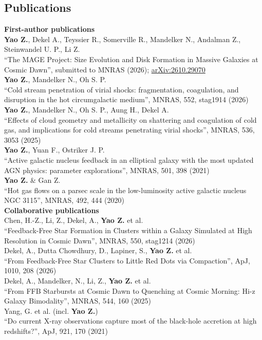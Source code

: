 \documentclass[margin, 10pt]{res} %
\begin{document}
\begin{resume}
\section{Publications}

\textbf{First-author publications}\\[4pt]
\textbf{Yao Z.}, Dekel A., Teyssier R., Somerville R., Mandelker N., Andalman Z., Steinwandel U. P., Li Z.\\
``The MAGE Project: Size Evolution and Disk Formation in Massive Galaxies at Cosmic Dawn'', submitted to MNRAS (2026); \href{https://arxiv.org/abs/2610.29070}{arXiv:2610.29070}\\[4pt]
\textbf{Yao Z.}, Mandelker N., Oh S. P.\\
``Cold stream penetration of virial shocks: fragmentation, coagulation, and disruption in the hot circumgalactic medium'', MNRAS, 552, stag1914 (2026)\\[4pt]
\textbf{Yao Z.}, Mandelker N., Oh S. P., Aung H., Dekel A.\\
``Effects of cloud geometry and metallicity on shattering and coagulation of cold gas, and implications for cold streams penetrating virial shocks'', MNRAS, 536, 3053 (2025)\\[4pt]
\textbf{Yao Z.}, Yuan F., Ostriker J. P.\\
``Active galactic nucleus feedback in an elliptical galaxy with the most updated AGN physics: parameter explorations'', MNRAS, 501, 398 (2021)\\[4pt]
\newpage
\textbf{Yao Z.} \& Gan Z.\\
``Hot gas flows on a parsec scale in the low-luminosity active galactic nucleus NGC 3115'', MNRAS, 492, 444 (2020)\\[10pt]
\textbf{Collaborative publications}\\[4pt]
Chen, H.-Z., Li, Z., Dekel, A., \textbf{Yao Z.} et al.\\
``Feedback-Free Star Formation in Clusters within a Galaxy Simulated at High Resolution in Cosmic Dawn'', MNRAS, 550, stag1214 (2026)\\[4pt]
Dekel, A., Dutta Chowdhury, D., Lapiner, S., \textbf{Yao Z.} et al.\\
``From Feedback-Free Star Clusters to Little Red Dots via Compaction'', ApJ, 1010, 208 (2026)\\[4pt]
Dekel, A., Mandelker, N., Li, Z., \textbf{Yao Z.} et al.\\
``From FFB Starbursts at Cosmic Dawn to Quenching at Cosmic Morning: Hi-z Galaxy Bimodality'', MNRAS, 544, 160 (2025)\\[4pt]
Yang, G. et al. (incl. \textbf{Yao Z.})\\
``Do current X-ray observations capture most of the black-hole accretion at high redshifts?'', ApJ, 921, 170 (2021)


\end{resume}
\end{document}
